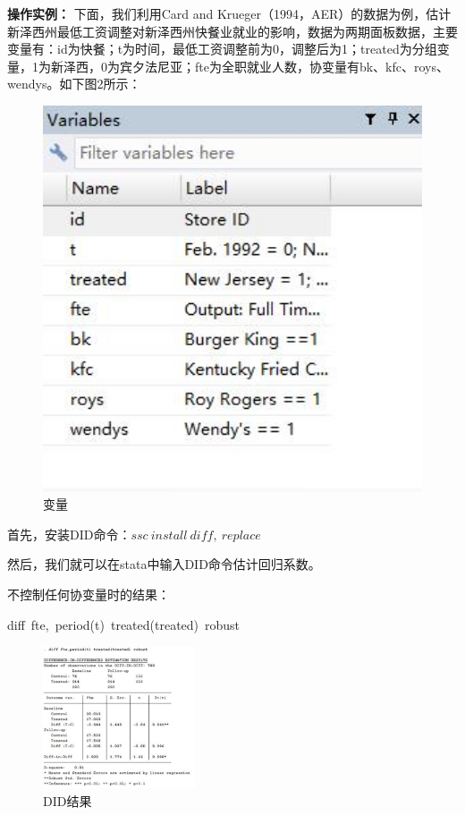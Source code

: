 \documentclass[cn,10pt,math=newtx,citestyle=gb7714-2015,bibstyle=gb7714-2015]{elegantbook}
\begin{document}
	\textbf{操作实例：}
	下面，我们利用Card and Krueger（1994，AER）的数据为例，估计新泽西州最低工资调整对新泽西州快餐业就业的影响，数据为两期面板数据，主要变量有：id为快餐；t为时间，最低工资调整前为0，调整后为1；treated为分组变量，1为新泽西，0为宾夕法尼亚；fte为全职就业人数，协变量有bk、kfc、roys、wendys。如下图2所示：
	\begin{figure}[htbp]
		\centering
		\includegraphics[width=1\textwidth]{var.jpg}
		\caption{变量}\label{fig:digit}
	\end{figure}
	
	首先，安装DID命令：$ssc~install~diff,~replace$
	
	然后，我们就可以在stata中输入DID命令估计回归系数。
	
	不控制任何协变量时的结果：
	
	diff~fte,~period(t)~treated(treated)~robust
	\begin{figure}[htbp]
		\centering
		\includegraphics[width=0.4\textwidth]{DIDresults.jpg}
		\caption{DID结果}\label{fig:digit}
	\end{figure}
	
\end{document}
